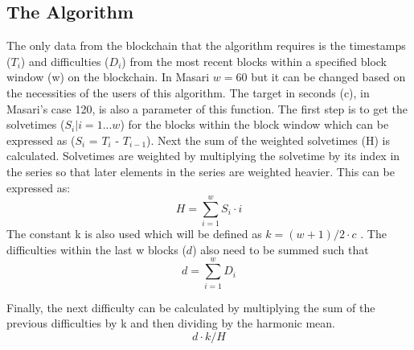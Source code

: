 \documentclass{article}
\begin{document}
\subsection{The Algorithm}
The only data
from the blockchain that the algorithm
requires is the timestamps ($T_{i}$) and
difficulties ($D_{i}$) from the most recent
blocks within a specified block window (w)
on the blockchain. In Masari $w = 60$ but it can be changed based on the necessities of the users of this algorithm. The target in seconds (c), in Masari's case 120, is also a parameter of this function. The first step is to get
the solvetimes ($S_{i} | i = 1 ... w$) for the blocks
within the block window which can be
expressed as ($S_{i}$ = $T_{i}$ - $T_{i-1}$). Next the sum of the weighted solvetimes (H) is calculated. Solvetimes are weighted by multiplying the solvetime by its index in the series so that later elements in the series are weighted heavier. This can be expressed as: 
$$H = \sum_{i=1}^{w} S_{i}\cdot i$$
The constant k is also used which will be defined as $k = (w+1)/2\cdot c$ .
The difficulties within the last w blocks ($d$) also need to be summed such that $$d = \sum_{i=1}^{w}D_i$$

Finally, the next difficulty can be calculated by multiplying the sum of the previous difficulties by k and then dividing by the harmonic mean.
 $$d\cdot k / H$$
 
\end{document}
